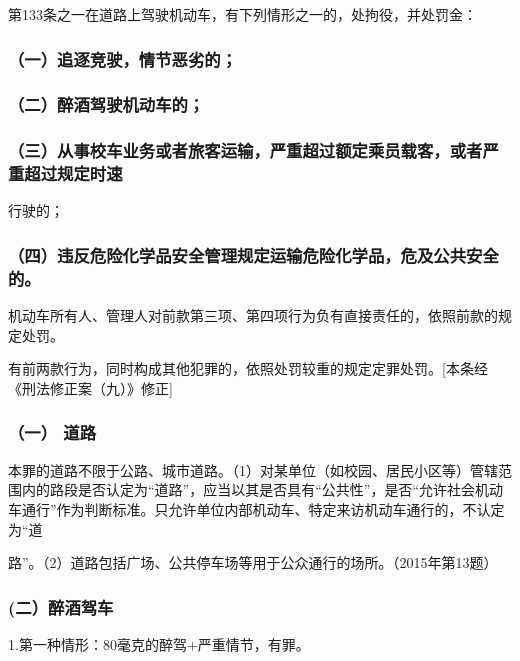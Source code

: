 第133条之一在道路上驾驶机动车，有下列情形之一的，处拘役，并处罚金：

\subsubsection*{（一）追逐竞驶，情节恶劣的；}

\subsubsection*{（二）醉酒驾驶机动车的；}

\subsubsection*{（三）从事校车业务或者旅客运输，严重超过额定乘员载客，或者严重超过规定时速}

行驶的；

\subsubsection*{（四）违反危险化学品安全管理规定运输危险化学品，危及公共安全的。}

机动车所有人、管理人对前款第三项、第四项行为负有直接责任的，依照前款的规定处罚。

有前两款行为，同时构成其他犯罪的，依照处罚较重的规定定罪处罚。[本条经《刑法修正案（九）》修正]

\subsubsection*{（一） 道路}

本罪的道路不限于公路、城市道路。（1）对某单位（如校园、居民小区等）管辖范围内的路段是否认定为“道路”，应当以其是否具有“公共性”，是否“允许社会机动车通行”作为判断标准。只允许单位内部机动车、特定来访机动车通行的，不认定为“道

路”。（2）道路包括广场、公共停车场等用于公众通行的场所。（2015年第13题）

\subsubsection*{(二）醉酒驾车\protect\footnotemark}

1.第一种情形：80毫克的醉驾+严重情节，有罪。

